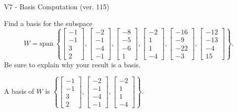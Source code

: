 \begin{exercise}
  \begin{exerciseTitle}V7 - Basis Computation (ver. 115)\end{exerciseTitle}
  \begin{exerciseStatement}
    Find a basis for the subspace 
\[W=\mathrm{span}\ \left\{\left[\begin{array}{r}
-1 \\
-1 \\
3 \\
2
\end{array}\right] , \left[\begin{array}{r}
-2 \\
-1 \\
-4 \\
-1
\end{array}\right] , \left[\begin{array}{r}
-8 \\
-5 \\
-6 \\
1
\end{array}\right] , \left[\begin{array}{r}
-2 \\
1 \\
1 \\
-4
\end{array}\right] , \left[\begin{array}{r}
-16 \\
-9 \\
-22 \\
-3
\end{array}\right] , \left[\begin{array}{r}
-12 \\
-13 \\
-4 \\
15
\end{array}\right]\right\}.\]
 Be sure to explain why your result is a basis.


  \end{exerciseStatement}
  \begin{exerciseAnswer}
   A basis of \(W\) is  \(\left\{\left[\begin{array}{r}
-1 \\
-1 \\
3 \\
2
\end{array}\right] , \left[\begin{array}{r}
-2 \\
-1 \\
-4 \\
-1
\end{array}\right] , \left[\begin{array}{r}
-2 \\
1 \\
1 \\
-4
\end{array}\right]\right\}\).
  


  \end{exerciseAnswer}
\end{exercise}